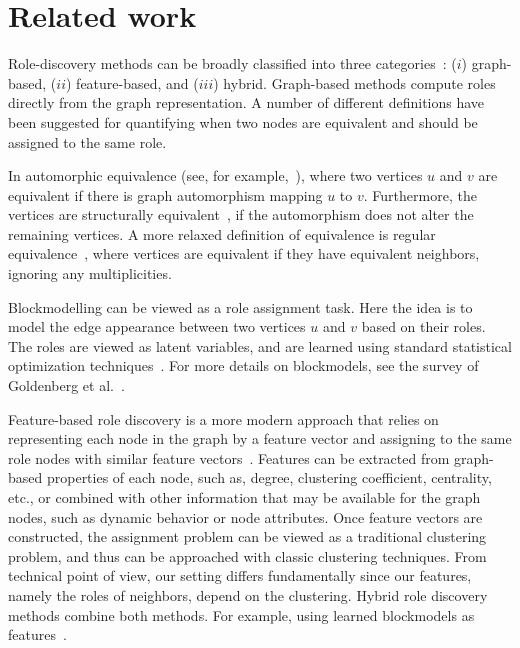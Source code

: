 \section{Related work}
\label{section:related}


Role-discovery methods can be broadly classified into three categories~\cite{rossi2015role}: 
($i$) graph-based, 
($ii$) feature-based, and 
($iii$) hybrid.
Graph-based methods compute roles directly from the graph representation. 
A number of different definitions have been suggested
for quantifying when two nodes are equivalent and should be assigned to the same role. 

In automorphic equivalence (see, for example,~\cite{hanneman:05:introduction}),
where two vertices $u$ and $v$ are equivalent if there is graph automorphism
mapping $u$ to $v$.  Furthermore, the vertices are structurally
equivalent~\cite{lorrain1971structural}, if the automorphism does not alter the
remaining vertices. A more relaxed definition of equivalence is regular
equivalence~\cite{everett1994regular}, where vertices are equivalent if they
have equivalent neighbors, ignoring any multiplicities. 

Blockmodelling can be viewed as a role assignment task. Here the idea is to
model the edge appearance between two vertices $u$ and $v$ based on their roles.
The roles are viewed as latent variables, and are learned using standard
statistical optimization techniques~\cite{snijders:97:estimation}.
For more details on blockmodels, see the survey of Goldenberg et al.~\cite{Goldenberg:2010:SSN}.

\iffalse
stochastic equivalence~\cite{holland1981exponential}.
Typically, methods for graph-based role discovery rely on 
blockmodels~\cite{airoldi2009mixed,holland1983stochastic}, 
which are based on matrix-decomposition techniques
and are not easily scalable to very large graphs. 
\fi

Feature-based role discovery is a more modern approach that relies on
representing each node in the graph by a feature vector and assigning to the
same role nodes with similar feature
vectors~\cite{henderson2012rolx,rossi2015role,rossi2013modeling,zhao2013inferring,gilpin2013guided}.
Features can be extracted from graph-based properties of each node, such as,
degree, clustering coefficient, centrality, etc., or combined with other
information that may be available for the graph nodes, such as dynamic behavior
or node attributes. 
Once feature vectors are constructed, the assignment
problem can be viewed as a traditional clustering problem, and thus can be
approached with classic clustering techniques. From technical point of view,
our setting differs fundamentally since our features, namely the roles of
neighbors, depend on the clustering.
Hybrid role discovery methods combine both methods. For example, using learned blockmodels
as features~\cite{rossi2015role}.

